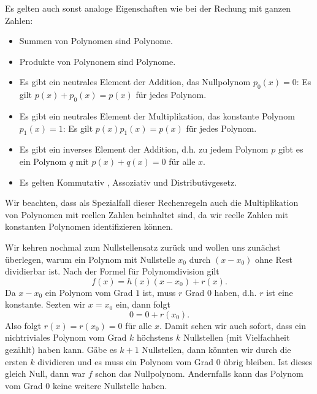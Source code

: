 Es gelten auch sonst analoge Eigenschaften wie bei der Rechung mit ganzen Zahlen:
\begin{itemize}
\item {} 
Summen von Polynomen sind Polynome.

\item {} 
Produkte von Polynonem sind Polynome.

\item {} 
Es gibt ein neutrales Element der Addition, das Nullpolynom \(p_0(x)=0\): Es gilt \(p(x) + p_0(x) = p(x)\) für jedes Polynom.

\item {} 
Es gibt ein neutrales Element der Multiplikation, das konstante Polynom \(p_1(x)=1\): Es gilt \(p(x) p_1(x) = p(x)\) für jedes Polynom.

\item {} 
Es gibt ein inverses Element der Addition, d.h. zu jedem Polynom \(p\) gibt es ein Polynom \(q\) mit \(p(x) + q(x) =0\) für alle \(x\).

\item {} 
Es gelten Kommutativ , Assoziativ  und Distributivgesetz.

\end{itemize}

Wir beachten, dass als Spezialfall dieser Rechenregeln auch die Multiplikation von Polynomen mit reellen Zahlen beinhaltet sind, da wir reelle Zahlen mit konstanten Polynomen identifizieren können.

Wir kehren nochmal zum Nullstellensatz zurück und wollen uns zunächst überlegen, warum ein Polynom mit Nullstelle \(x_0\) durch \((x-x_0)\) ohne Rest dividierbar ist. Nach der Formel für Polynomdivision gilt
\begin{equation*}
 f(x) = h(x) (x-x_0) + r(x).
\end{equation*}
Da \(x-x_0\) ein Polynom vom Grad \(1\) ist, muss \(r\) Grad \(0\) haben, d.h. \(r\) ist eine konstante. Sezten wir \(x=x_0\) ein, dann folgt
\begin{equation*}
 0 = 0 + r(x_0) .\end{equation*}
Also folgt \(r(x) =r(x_0) = 0\) für alle \(x\). Damit sehen wir auch sofort, dass ein nichtriviales Polynom vom Grad \(k\) höchstens \(k\) Nullstellen (mit Vielfachheit gezählt) haben kann. Gäbe es \(k+1\) Nullstellen, dann könnten wir durch die ersten \(k\) dividieren und es muss ein Polynom vom Grad \(0\) übrig bleiben. Ist dieses gleich Null, dann war \(f\) schon das Nullpolynom. Andernfalls kann das Polynom vom Grad \(0\) keine weitere Nullstelle haben.


